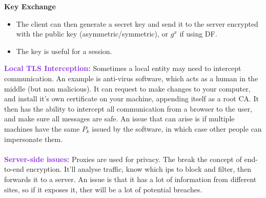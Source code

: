 \documentclass[a4paper,10pt]{article}
\begin{document}
\textbf{Key Exchange}
\begin{itemize}
\item The client can then generate a secret key and send it to the server encrypted with the public key (asymmetric/symmetric), or $g^{x}$ if using DF. 
\item The key is useful for a session. 
\end{itemize}
\textcolor{BlueViolet}{\textbf{Local TLS Interception:}} Sometimes a local entity may need to intercept communication. An example is anti-virus software, which acts as a human in the middle (but non malicious). It can request to make changes to your computer, and install it's own certificate on your machine, appending itself as a root CA. It then has the ability to intercept all communication from a browser to the user, and make sure all messages are safe. An issue that can arise is if multiple machines have the same $P_k$ issued by the software, in which case other people can impersonate them. \\\\ 
\textcolor{BlueViolet}{\textbf{Server-side issues:}} Proxies are used for privacy. The break the concept of end-to-end encryption. It'll analyse traffic, know which ips to block and filter, then forwards it to a server. An issue is that it has a lot of information from different sites, so if it exposes it, ther will be a lot of potential breaches. \\\\
\textcolor{BlueViolet}{\textbf{}}
\textcolor{BlueViolet}{\textbf{}}
\textcolor{BlueViolet}{\textbf{}}
\textcolor{BlueViolet}{\textbf{}}
\textcolor{BlueViolet}{\textbf{}}
\textcolor{BlueViolet}{\textbf{}}
\end{document}
